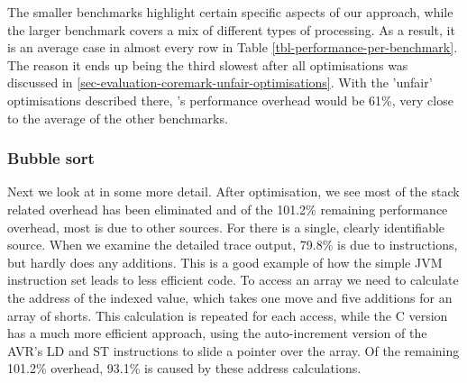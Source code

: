 The smaller benchmarks highlight certain specific aspects of our approach, while the larger  benchmark covers a mix of different types of processing. As a result, it is an average case in almost every row in Table \ref{tbl-performance-per-benchmark}. The reason it ends up being the third slowest after all optimisations was discussed in \ref{sec-evaluation-coremark-unfair-optimisations}. With the 'unfair' optimisations described there, 's performance overhead would be 61\%, very close to the average of the other benchmarks.

\subsubsection{Bubble sort}
\label{sec-evaluation-bubble-sort}
Next we look at  in some more detail. After optimisation, we see most of the stack related overhead has been eliminated and of the 101.2\% remaining performance overhead, most is due to other sources. For  there is a single, clearly identifiable source. When we examine the detailed trace output,  79.8\% is due to  instructions, but  hardly does any additions. This is a good example of how the simple JVM instruction set leads to less efficient code. To access an array we need to calculate the address of the indexed value, which takes one move and five additions for an array of shorts. This calculation is repeated for each access, while the C version has a much more efficient approach, using the auto-increment version of the AVR's LD and ST instructions to slide a pointer over the array. Of the remaining 101.2\% overhead, 93.1\% is caused by these address calculations.

%

